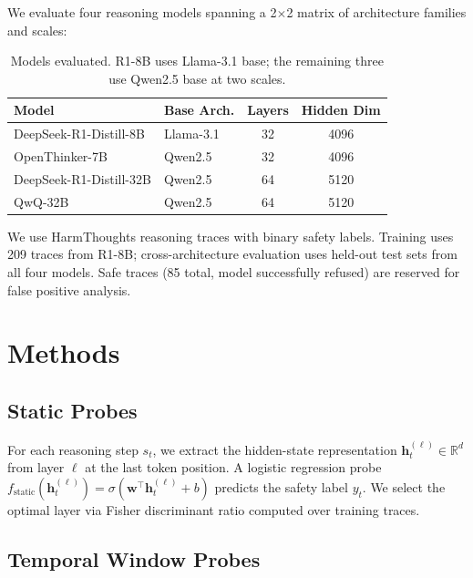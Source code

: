 \documentclass[11pt,a4paper]{article}
\begin{document}
We evaluate four reasoning models spanning a 2$\times$2 matrix of architecture families and scales:

\begin{table}[h]
\centering
\small
\begin{tabular}{llcc}
\toprule
\textbf{Model} & \textbf{Base Arch.} & \textbf{Layers} & \textbf{Hidden Dim} \\
\midrule
DeepSeek-R1-Distill-8B & Llama-3.1 & 32 & 4096 \\
OpenThinker-7B & Qwen2.5 & 32 & 4096 \\
DeepSeek-R1-Distill-32B & Qwen2.5 & 64 & 5120 \\
QwQ-32B & Qwen2.5 & 64 & 5120 \\
\bottomrule
\end{tabular}
\caption{Models evaluated. R1-8B uses Llama-3.1 base; the remaining three use Qwen2.5 base at two scales.}
\label{tab:models}
\end{table}

We use HarmThoughts reasoning traces with binary safety labels. Training uses 209 traces from R1-8B; cross-architecture evaluation uses held-out test sets from all four models. Safe traces (85 total, model successfully refused) are reserved for false positive analysis.

\section{Methods}
\label{sec:methods}

\subsection{Static Probes}
\label{sec:static}

For each reasoning step $s_t$, we extract the hidden-state representation $\mathbf{h}_t^{(\ell)} \in \mathbb{R}^d$ from layer $\ell$ at the last token position. A logistic regression probe $f_\text{static}(\mathbf{h}_t^{(\ell)}) = \sigma(\mathbf{w}^\top \mathbf{h}_t^{(\ell)} + b)$ predicts the safety label $y_t$. We select the optimal layer via Fisher discriminant ratio computed over training traces.

\subsection{Temporal Window Probes}
\label{sec:temporal}
\end{document}
